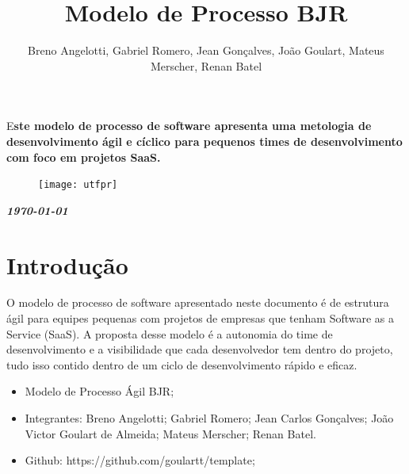 \documentclass[	DIV=calc,%
							paper=a4,%
							fontsize=12pt,%
							onecolumn]{scrartcl}	 					%
\title{Modelo de Processo BJR}					%
\author{Breno Angelotti, Gabriel Romero, Jean Gonçalves, João Goulart, Mateus Merscher, Renan Batel }  	%
\date{}																				%
\newcommand{\initial}[1]{%
     \lettrine[lines=3,lhang=0.3,nindent=0em]{
     				\color{DarkGoldenrod}
     				{\textsf{#1}}}{}}
\begin{document}
\maketitle
\thispagestyle{fancy} 	
\thispagestyle{empty}		%




\initial{E}\textbf{ste modelo de processo de software apresenta uma metologia de desenvolvimento ágil e cíclico para pequenos times de desenvolvimento com foco em projetos SaaS.}

\begin{figure}
	\centering
	\texttt{[image: utfpr]}
\end{figure}

\vspace{3cm}
\centerline{\textit{\textbf{\today}}}

\clearpage
    \renewcommand*\listfigurename{Lista de figuras}
\listoffigures

\renewcommand*\listtablename{Lista de tabelas}
\listoftables




\clearpage
\renewcommand{\contentsname}{Sumário}
\tableofcontents
\clearpage

\section{Introdução}
O modelo de processo de software apresentado neste documento é de estrutura ágil para equipes pequenas com projetos de empresas que tenham Software as a Service (SaaS). A proposta desse modelo é a autonomia do time de desenvolvimento e a visibilidade que cada desenvolvedor tem dentro do projeto, tudo isso contido dentro de um ciclo de desenvolvimento rápido e eficaz.

\begin{itemize}
	\item Modelo de Processo Ágil BJR;
	\item Integrantes: Breno Angelotti; Gabriel Romero; Jean Carlos Gonçalves; João Victor Goulart de Almeida; Mateus Merscher; Renan Batel.
	\item Github: https://github.com/goulartt/template;
\end{itemize}
\end{document}
